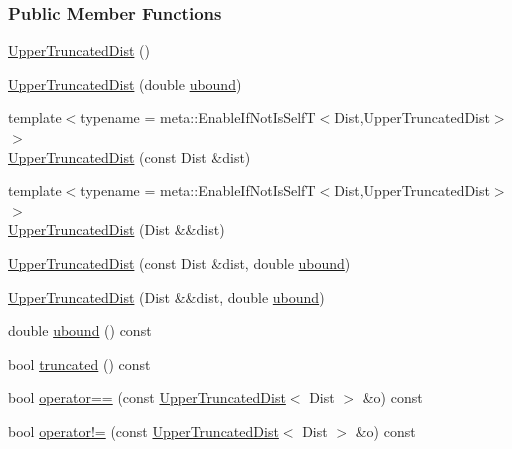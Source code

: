 \subsubsection*{Public Member Functions}
\begin{DoxyCompactItemize}
\item 
\hyperlink{classprior__hessian_1_1UpperTruncatedDist_a45cdc66d32199c2aade5a5892a9a7c05}{Upper\+Truncated\+Dist} ()
\item 
\hyperlink{classprior__hessian_1_1UpperTruncatedDist_ab9763bbf7d9bf54d055c7a892149843f}{Upper\+Truncated\+Dist} (double \hyperlink{classprior__hessian_1_1UpperTruncatedDist_a047a08465860a8f2aea2af28760df905}{ubound})
\item 
{\footnotesize template$<$typename  = meta\+::\+Enable\+If\+Not\+Is\+Self\+T$<$\+Dist,\+Upper\+Truncated\+Dist$>$$>$ }\\\hyperlink{classprior__hessian_1_1UpperTruncatedDist_a68d69a93c4b2c03d4722d786ee0768b9}{Upper\+Truncated\+Dist} (const Dist \&dist)
\item 
{\footnotesize template$<$typename  = meta\+::\+Enable\+If\+Not\+Is\+Self\+T$<$\+Dist,\+Upper\+Truncated\+Dist$>$$>$ }\\\hyperlink{classprior__hessian_1_1UpperTruncatedDist_a239381122e821a7fef136f73c020b686}{Upper\+Truncated\+Dist} (Dist \&\&dist)
\item 
\hyperlink{classprior__hessian_1_1UpperTruncatedDist_ac0d0f783684526e4d5a7b2bbf1739a05}{Upper\+Truncated\+Dist} (const Dist \&dist, double \hyperlink{classprior__hessian_1_1UpperTruncatedDist_a047a08465860a8f2aea2af28760df905}{ubound})
\item 
\hyperlink{classprior__hessian_1_1UpperTruncatedDist_accacee981e0d6cdc31486668914437c1}{Upper\+Truncated\+Dist} (Dist \&\&dist, double \hyperlink{classprior__hessian_1_1UpperTruncatedDist_a047a08465860a8f2aea2af28760df905}{ubound})
\item 
double \hyperlink{classprior__hessian_1_1UpperTruncatedDist_a047a08465860a8f2aea2af28760df905}{ubound} () const 
\item 
bool \hyperlink{classprior__hessian_1_1UpperTruncatedDist_a52deb194a5783bde34c1d73184c47064}{truncated} () const 
\item 
bool \hyperlink{classprior__hessian_1_1UpperTruncatedDist_af7722f606ae90120e6fdbbd8418170c1}{operator==} (const \hyperlink{classprior__hessian_1_1UpperTruncatedDist}{Upper\+Truncated\+Dist}$<$ Dist $>$ \&o) const 
\item 
bool \hyperlink{classprior__hessian_1_1UpperTruncatedDist_a3396c4b08ddb07235c10c4edc97b96e3}{operator!=} (const \hyperlink{classprior__hessian_1_1UpperTruncatedDist}{Upper\+Truncated\+Dist}$<$ Dist $>$ \&o) const 

\end{DoxyCompactItemize}
